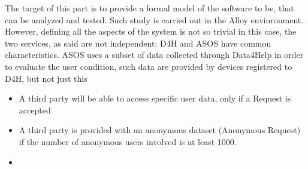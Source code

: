 
The target of this part is to provide a formal model of the software to be, that can be analyzed and tested. Such study is carried out in the Alloy envinronment.  However, defining all the aspects of the system is not so trivial in this case, the two services, as said are not independent: D4H and ASOS have common characteristics. ASOS uses a subset of data collected through Data4Help in order to evaluate the user condition, such data are provided by devices registered to D4H, but not just this

\begin{itemize}
	\item A third party will be able to access specific user data, only if a Request is accepted
	\item A third party is provided with an anonymous dataset (Anonymous Request) if the number of anonymous users involved is at least 1000.
	\item 
\end{itemize}